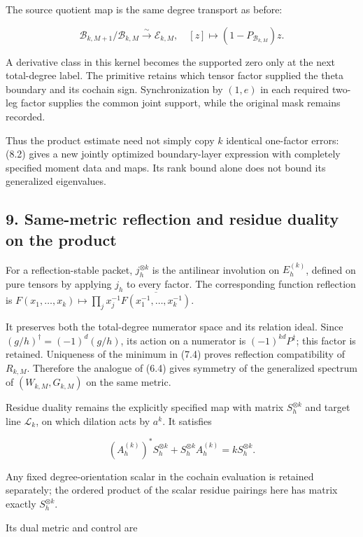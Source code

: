 \documentclass[
]{article}
\begin{document}
The source quotient map is the same degree transport as before:

\[\mathcal B_{k,M+1}/\mathcal B_{k,M}\xrightarrow{\sim}\mathcal E_{k,M},\quad[z]\mapsto(1-P_{\mathcal B_{k,M}})z.\]

A derivative class in this kernel becomes the supported zero only at the
next total-degree label. The primitive retains which tensor factor
supplied the theta boundary and its cochain sign. Synchronization by
\((1,e)\) in each required two-leg factor supplies the common joint
support, while the original mask remains recorded.

Thus the product estimate need not simply copy \(k\) identical
one-factor errors: (8.2) gives a new jointly optimized boundary-layer
expression with completely specified moment data and maps. Its rank
bound alone does not bound its generalized eigenvalues.

\subsection{9. Same-metric reflection and residue duality on the
product}\label{same-metric-reflection-and-residue-duality-on-the-product}

For a reflection-stable packet, \(j_h^{\otimes k}\) is the antilinear
involution on \(E_h^{(k)}\), defined on pure tensors by applying \(j_h\)
to every factor. The corresponding function reflection is
\(F(x_1,\ldots,x_k)\mapsto\prod_jx_j^{-1}\overline{F(x_1^{-1},\ldots,x_k^{-1})}\).

It preserves both the total-degree numerator space and its relation
ideal. Since \((g/h)^\dagger=(-1)^d(g/h)\), its action on a numerator is
\((-1)^{kd}P^\dagger\); this factor is retained. Uniqueness of the
minimum in (7.4) proves reflection compatibility of \(R_{k,M}\).
Therefore the analogue of (6.4) gives symmetry of the generalized
spectrum of \((W_{k,M},G_{k,M})\) on the same metric.

Residue duality remains the explicitly specified map with matrix
\(S_h^{\otimes k}\) and target line \(\mathcal L_k\), on which dilation
acts by \(a^k\). It satisfies

\[(A_h^{(k)})^*S_h^{\otimes k}+S_h^{\otimes k}A_h^{(k)}=kS_h^{\otimes k}.\]

Any fixed degree-orientation scalar in the cochain evaluation is
retained separately; the ordered product of the scalar residue pairings
here has matrix exactly \(S_h^{\otimes k}\).

Its dual metric and control are
\end{document}
